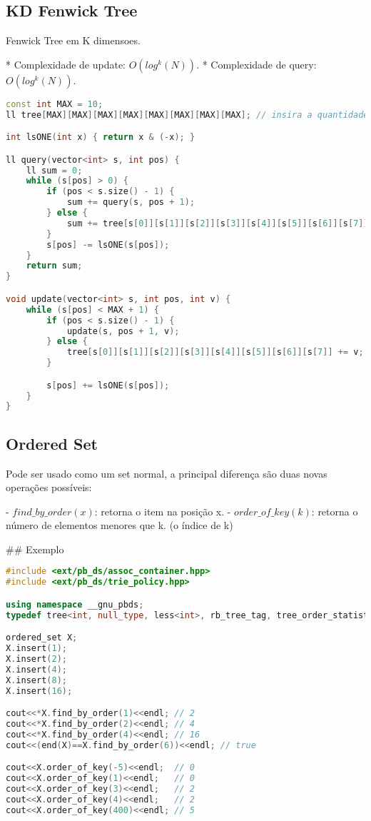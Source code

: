 \documentclass[11pt, a4paper, twoside]{article}
\begin{document}
\subsection{KD Fenwick Tree}



Fenwick Tree em K dimensoes.

* Complexidade de update: $O(log^k(N))$.
* Complexidade de query: $O(log^k(N))$.
\begin{lstlisting}[language=C++]
const int MAX = 10;
ll tree[MAX][MAX][MAX][MAX][MAX][MAX][MAX][MAX]; // insira a quantidade necessaria de dimensoes

int lsONE(int x) { return x & (-x); }

ll query(vector<int> s, int pos) {
    ll sum = 0;
    while (s[pos] > 0) {
        if (pos < s.size() - 1) {
            sum += query(s, pos + 1);
        } else {
            sum += tree[s[0]][s[1]][s[2]][s[3]][s[4]][s[5]][s[6]][s[7]];
        }
        s[pos] -= lsONE(s[pos]);
    }
    return sum;
}

void update(vector<int> s, int pos, int v) {
    while (s[pos] < MAX + 1) {
        if (pos < s.size() - 1) {
            update(s, pos + 1, v);
        } else {
            tree[s[0]][s[1]][s[2]][s[3]][s[4]][s[5]][s[6]][s[7]] += v;
        }

        s[pos] += lsONE(s[pos]);
    }
}\end{lstlisting}

\subsection{Ordered Set}



Pode ser usado como um set normal, a principal diferença são duas novas operações possíveis:

- $find\_by\_order(x)$: retorna o item na posição x.
- $order\_of\_key(k)$: retorna o número de elementos menores que k. (o índice de k)

\#\# Exemplo
\begin{lstlisting}[language=C++]
#include <ext/pb_ds/assoc_container.hpp>
#include <ext/pb_ds/trie_policy.hpp>

using namespace __gnu_pbds;
typedef tree<int, null_type, less<int>, rb_tree_tag, tree_order_statistics_node_update> ordered_set;

ordered_set X;
X.insert(1);
X.insert(2);
X.insert(4);
X.insert(8);
X.insert(16);

cout<<*X.find_by_order(1)<<endl; // 2
cout<<*X.find_by_order(2)<<endl; // 4
cout<<*X.find_by_order(4)<<endl; // 16
cout<<(end(X)==X.find_by_order(6))<<endl; // true

cout<<X.order_of_key(-5)<<endl;  // 0
cout<<X.order_of_key(1)<<endl;   // 0
cout<<X.order_of_key(3)<<endl;   // 2
cout<<X.order_of_key(4)<<endl;   // 2
cout<<X.order_of_key(400)<<endl; // 5

\end{lstlisting}
\end{document}
